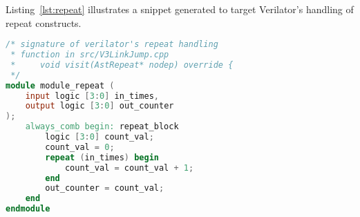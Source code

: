 % 




Listing~\ref{lst:repeat} illustrates a snippet generated to target Verilator's handling of repeat constructs.

\begin{lstlisting}[caption={Example of a snippet generated to target Verilator's handling of repeat constructs.},label={lst:repeat},language=verilog,breaklines=true]
/* signature of verilator's repeat handling 
 * function in src/V3LinkJump.cpp 
 *     void visit(AstRepeat* nodep) override {
 */
module module_repeat (
    input logic [3:0] in_times,
    output logic [3:0] out_counter
);
    always_comb begin: repeat_block
        logic [3:0] count_val;
        count_val = 0;
        repeat (in_times) begin
            count_val = count_val + 1;
        end
        out_counter = count_val;
    end
endmodule
\end{lstlisting}

